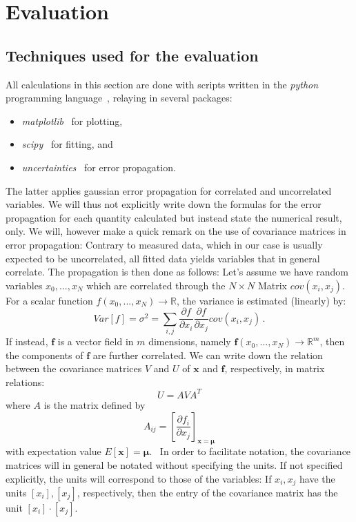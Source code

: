 \section{Evaluation}
\subsection{Techniques used for the evaluation}
All calculations in this section are done with scripts written in 
the \textit{python} programming language~\cite{python}, relaying in several 
packages:
\begin{itemize}
    \item
        \textit{matplotlib}~\cite{Hunter2007} for plotting,
    \item
        \textit{scipy}~\cite{scipy} for fitting, and 
    \item
        \textit{uncertainties}~\cite{uc} for error propagation.
\end{itemize}
The latter applies gaussian error propagation for correlated and uncorrelated variables. 
We will thus not explicitly write down the formulas for the error propagation 
for each quantity calculated but instead state the numerical result, only. 
We will, however make a quick remark on the use of covariance matrices in 
error propagation: Contrary to measured data, which in our case is usually 
expected to be uncorrelated, all fitted data yields variables that in general correlate. 
The propagation is then done as follows:
Let's assume we have random
variables $x_0,...,x_N$ which are correlated through the $N\times N$ Matrix $cov(x_i,x_j)$.
For a scalar function $f(x_0,...,x_N) \rightarrow \mathbb{R}$, the variance is estimated (linearly) by:
\begin{equation}
Var[f] = \sigma^2 = \sum_{i,j} \frac{\partial f}{\partial x_i} \frac{\partial f}{\partial x_j} cov(x_i,x_j) \,.
\end{equation} 
If instead, $\mathbf{f}$ is a vector field in $m$ dimensions, namely 
$\mathbf{f}(x_0,...,x_N) \rightarrow \mathbb{R}^m$, then the components of $\mathbf{f}$ 
are further correlated. We can write down the relation between the covariance matrices $V$ and $U$ of 
$\mathbf{x}$ and $\mathbf{f}$, respectively, in matrix relations:
\begin{equation}
    U = A V A^T
\end{equation}
where $A$ is the matrix defined by 
\begin{equation}
    A_{ij} = \left[ \frac{\partial f_i}{\partial x_j}\right]_{\mathbf{x} = \mathbf{\mu}}
\end{equation}
with expectation value $E[\mathbf{x}] = \mathbf{\mu}$.~\cite{cowan1998statistical}
In order to facilitate notation, the covariance matrices will in general be notated without 
specifying the units. If not specified explicitly, the units will correspond to those of the
variables: If $x_i, x_j$ have the units $[x_i], [x_j]$, respectively, 
then the entry of the covariance matrix has the unit $[x_i] \cdot [x_j]$. 



